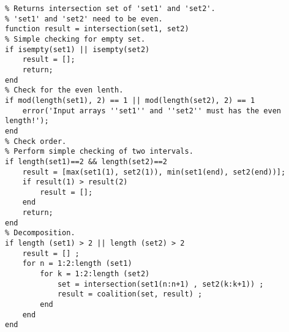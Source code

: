 \begin{verbatim}
% Returns intersection set of 'set1' and 'set2'.
% 'set1' and 'set2' need to be even.
function result = intersection(set1, set2)
% Simple checking for empty set.
if isempty(set1) || isempty(set2)
    result = [];
    return;
end
% Check for the even lenth.
if mod(length(set1), 2) == 1 || mod(length(set2), 2) == 1
    error('Input arrays ''set1'' and ''set2'' must has the even length!');
end
% Check order.
% Perform simple checking of two intervals.
if length(set1)==2 && length(set2)==2
    result = [max(set1(1), set2(1)), min(set1(end), set2(end))];
    if result(1) > result(2)
        result = [];
    end
    return;
end
% Decomposition.
if length (set1) > 2 || length (set2) > 2
    result = [] ;
    for n = 1:2:length (set1)
        for k = 1:2:length (set2)
            set = intersection(set1(n:n+1) , set2(k:k+1)) ;
            result = coalition(set, result) ;
        end
    end
end
\end{verbatim}
